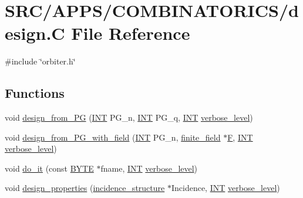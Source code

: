 \hypertarget{_a_p_p_s_2_c_o_m_b_i_n_a_t_o_r_i_c_s_2design_8_c}{}\section{S\+R\+C/\+A\+P\+P\+S/\+C\+O\+M\+B\+I\+N\+A\+T\+O\+R\+I\+C\+S/design.C File Reference}
\label{_a_p_p_s_2_c_o_m_b_i_n_a_t_o_r_i_c_s_2design_8_c}
{\ttfamily \#include \char`\"{}orbiter.\+h\char`\"{}}\newline
\subsection*{Functions}
\begin{DoxyCompactItemize}
\item 
void \mbox{\hyperlink{_a_p_p_s_2_c_o_m_b_i_n_a_t_o_r_i_c_s_2design_8_c_aaac4564bcb168115351dacf8aefd1001}{design\+\_\+from\+\_\+\+PG}} (\mbox{\hyperlink{galois_8h_a09fddde158a3a20bd2dcadb609de11dc}{I\+NT}} P\+G\+\_\+n, \mbox{\hyperlink{galois_8h_a09fddde158a3a20bd2dcadb609de11dc}{I\+NT}} P\+G\+\_\+q, \mbox{\hyperlink{galois_8h_a09fddde158a3a20bd2dcadb609de11dc}{I\+NT}} \mbox{\hyperlink{simeon_8_c_a818073fbcc2f439e7c56952f67386122}{verbose\+\_\+level}})
\item 
void \mbox{\hyperlink{_a_p_p_s_2_c_o_m_b_i_n_a_t_o_r_i_c_s_2design_8_c_a5d0ddbe05228e631bc5fc469bc9ba6dd}{design\+\_\+from\+\_\+\+P\+G\+\_\+with\+\_\+field}} (\mbox{\hyperlink{galois_8h_a09fddde158a3a20bd2dcadb609de11dc}{I\+NT}} P\+G\+\_\+n, \mbox{\hyperlink{classfinite__field}{finite\+\_\+field}} $\ast$\mbox{\hyperlink{simeon_8_c_a21a61c535ff7d9d4b674461d3b19fffa}{F}}, \mbox{\hyperlink{galois_8h_a09fddde158a3a20bd2dcadb609de11dc}{I\+NT}} \mbox{\hyperlink{simeon_8_c_a818073fbcc2f439e7c56952f67386122}{verbose\+\_\+level}})
\item 
void \mbox{\hyperlink{_a_p_p_s_2_c_o_m_b_i_n_a_t_o_r_i_c_s_2design_8_c_a8322e25d1cf794bd03fd8d56554a003f}{do\+\_\+it}} (const \mbox{\hyperlink{galois_8h_ab6cc7b4aeb6ea31aba2b3fbfc83ff5e6}{B\+Y\+TE}} $\ast$fname, \mbox{\hyperlink{galois_8h_a09fddde158a3a20bd2dcadb609de11dc}{I\+NT}} \mbox{\hyperlink{simeon_8_c_a818073fbcc2f439e7c56952f67386122}{verbose\+\_\+level}})
\item 
void \mbox{\hyperlink{_a_p_p_s_2_c_o_m_b_i_n_a_t_o_r_i_c_s_2design_8_c_a7d7aac893d68b4a25d1ab91b57ae2af1}{design\+\_\+properties}} (\mbox{\hyperlink{classincidence__structure}{incidence\+\_\+structure}} $\ast$Incidence, \mbox{\hyperlink{galois_8h_a09fddde158a3a20bd2dcadb609de11dc}{I\+NT}} \mbox{\hyperlink{simeon_8_c_a818073fbcc2f439e7c56952f67386122}{verbose\+\_\+level}})

\end{DoxyCompactItemize}
